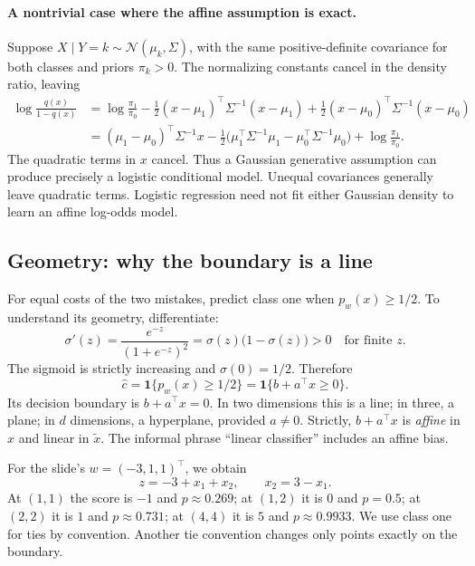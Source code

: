\paragraph{A nontrivial case where the affine assumption is exact.}
Suppose $X\mid Y=k\sim\mathcal N(\mu_k,\Sigma)$, with the same positive-definite
covariance for both classes and priors $\pi_k>0$. The normalizing constants cancel
in the density ratio, leaving
\begin{align*}
\log\frac{q(x)}{1-q(x)}
&=\log\frac{\pi_1}{\pi_0}
-\frac12(x-\mu_1)^\top\Sigma^{-1}(x-\mu_1)
+\frac12(x-\mu_0)^\top\Sigma^{-1}(x-\mu_0)\\
&=(\mu_1-\mu_0)^\top\Sigma^{-1}x
-\frac12\bigl(\mu_1^\top\Sigma^{-1}\mu_1
             -\mu_0^\top\Sigma^{-1}\mu_0\bigr)
+\log\frac{\pi_1}{\pi_0}.
\end{align*}
The quadratic terms in $x$ cancel. Thus a Gaussian generative assumption can
produce precisely a logistic conditional model. Unequal covariances generally
leave quadratic terms. Logistic regression need not fit either Gaussian density
to learn an affine log-odds model.

\subsection{Geometry: why the boundary is a line}
For equal costs of the two mistakes, predict class one when $p_w(x)\geq 1/2$.
To understand its geometry, differentiate:
\[
\sigma'(z)=\frac{e^{-z}}{(1+e^{-z})^2}
=\sigma(z)\bigl(1-\sigma(z)\bigr)>0
\quad\text{for finite }z.
\]
The sigmoid is strictly increasing and $\sigma(0)=1/2$. Therefore
\begin{equation}
\hat c=\mathbf 1\{p_w(x)\geq 1/2\}
=\mathbf 1\{b+a^\top x\geq0\}.
\label{eq:lr11-boundary}
\end{equation}
Its decision boundary is $b+a^\top x=0$. In two dimensions this is a line; in
three, a plane; in $d$ dimensions, a hyperplane, provided $a\ne0$.
Strictly, $b+a^\top x$ is \emph{affine} in $x$ and linear in $\tilde x$.
The informal phrase ``linear classifier'' includes an affine bias.

For the slide's $w=(-3,1,1)^\top$, we obtain
\[
z=-3+x_1+x_2,\qquad x_2=3-x_1.
\]
At $(1,1)$ the score is $-1$ and $p\approx0.269$; at $(1,2)$ it is $0$ and
$p=0.5$; at $(2,2)$ it is $1$ and $p\approx0.731$; at $(4,4)$ it is $5$ and
$p\approx0.9933$. We use class one for ties by convention. Another tie convention
changes only points exactly on the boundary.

